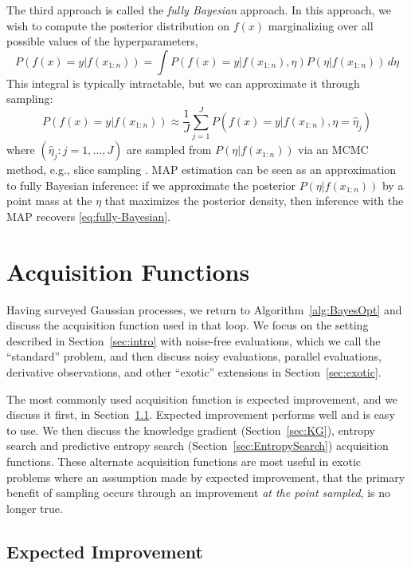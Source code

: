 \documentclass{article}
\begin{document}
The third approach is called the {\it fully Bayesian} approach.  In this approach, we wish to compute the posterior distribution on $f(x)$ marginalizing over all possible values of the hyperparameters,
\begin{equation}
P(f(x) = y | f(x_{1:n})) = \int P(f(x) = y | f(x_{1:n}), \eta) P(\eta | f(x_{1:n}))\, d\eta
\label{eq:fully-Bayesian}
\end{equation}
This integral is typically intractable, but we can approximate it through sampling:
\begin{equation}
P(f(x) = y | f(x_{1:n})) \approx \frac1J \sum_{j=1}^J P(f(x) = y | f(x_{1:n}), \eta = \hat{\eta}_j)
\end{equation}
where $(\hat{\eta}_j : j = 1,\ldots,J)$ are sampled from $P(\eta | f(x_{1:n}))$ via an MCMC method, e.g., slice sampling \citep{neal2003slice}.
MAP estimation can be seen as an approximation to fully Bayesian inference: if we approximate the posterior $P(\eta | f(x_{1:n}))$ by a point mass at the $\eta$ 
that maximizes the posterior density,
then inference with the MAP recovers \eqref{eq:fully-Bayesian}.


\section{Acquisition Functions}
\label{sec:acquisition}

Having surveyed Gaussian processes, we return to Algorithm~\ref{alg:BayesOpt} and discuss the acquisition function used in that loop.  We focus on the setting described in Section~\ref{sec:intro} with noise-free evaluations, which we call the ``standard'' problem, and then discuss noisy evaluations, parallel evaluations, derivative observations, and other ``exotic'' extensions in Section~\ref{sec:exotic}.

The most commonly used acquisition function is expected improvement, and we discuss it first, in Section~\ref{sec:EI}.  Expected improvement performs well and is easy to use.  We then discuss the knowledge gradient (Section~\ref{sec:KG}), entropy search and predictive entropy search (Section~\ref{sec:EntropySearch}) acquisition functions.  These alternate acquisition functions are most useful in exotic problems where an assumption made by expected improvement, that the primary benefit of sampling occurs through an improvement {\it at the point sampled}, is no longer true.


\subsection{Expected Improvement}
\label{sec:EI}
\end{document}
